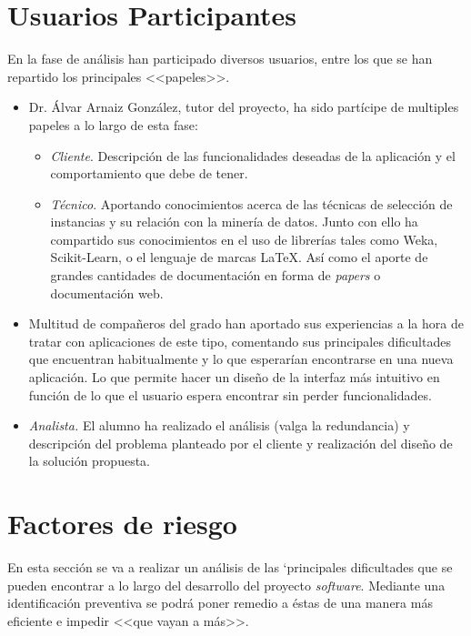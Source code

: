 \section{Usuarios Participantes}\label{usuarios-participantes}
En la fase de análisis han participado diversos usuarios, entre los que se han repartido los principales <<papeles>>.
\begin{itemize}
\item Dr. Álvar Arnaiz González, tutor del proyecto, ha sido partícipe de multiples papeles a lo largo de esta fase:
\begin{itemize}
\item \textit{Cliente}. Descripción de las funcionalidades deseadas de la aplicación y el comportamiento que debe de tener.
\item \textit{Técnico}. Aportando conocimientos acerca de las técnicas de selección de instancias y su relación con la minería de datos. Junto con ello ha compartido sus conocimientos en el uso de librerías tales como Weka, Scikit-Learn, o el lenguaje de marcas \LaTeX. Así como el aporte de grandes cantidades de documentación en forma de \textit{papers} o documentación web. 
\end{itemize}
\item Multitud de compañeros del grado han aportado sus experiencias a la hora de tratar con aplicaciones de este tipo, comentando sus principales dificultades que encuentran habitualmente y lo que esperarían encontrarse en una nueva aplicación. Lo que permite hacer un diseño de la interfaz más intuitivo en función de lo que el usuario espera encontrar sin perder funcionalidades.
\item \textit{Analista.} El alumno ha realizado el análisis (valga la redundancia) y descripción del problema planteado por el cliente y realización del diseño de la solución propuesta.
\end{itemize}

\newpage
\section{Factores de riesgo}\label{factores-de-riesgo}
En esta sección se va a realizar un análisis de las `principales dificultades que se pueden encontrar a lo largo del desarrollo del proyecto \textit{software}. Mediante una identificación preventiva se podrá poner remedio a éstas de una manera más eficiente e impedir <<que vayan a más>>.

